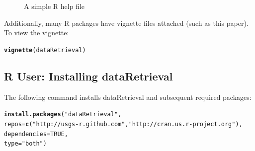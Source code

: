 \documentclass[a4paper,11pt]{article}\usepackage[]{graphicx}\usepackage[]{color}
\makeatletter
\newcommand{\hlnum}[1]{\textcolor[rgb]{0.686,0.059,0.569}{#1}}%
\newcommand{\hlstr}[1]{\textcolor[rgb]{0.192,0.494,0.8}{#1}}%
\newcommand{\hlstd}[1]{\textcolor[rgb]{0.345,0.345,0.345}{#1}}%
\newcommand{\hlkwc}[1]{\textcolor[rgb]{0.333,0.667,0.333}{#1}}%
\newcommand{\hlkwd}[1]{\textcolor[rgb]{0.737,0.353,0.396}{\textbf{#1}}}%
\newenvironment{kframe}{%
 \def\at@end@of@kframe{}%
 \ifinner\ifhmode%
  \def\at@end@of@kframe{\end{minipage}}%
  \begin{minipage}{\columnwidth}%
 \fi\fi%
 \def\FrameCommand##1{\hskip\@totalleftmargin \hskip-\fboxsep
 \colorbox{shadecolor}{##1}\hskip-\fboxsep
     \hskip-\linewidth \hskip-\@totalleftmargin \hskip\columnwidth}%
 \MakeFramed {\advance\hsize-\width
   \@totalleftmargin\z@ \linewidth\hsize
   \@setminipage}}%
 {\par\unskip\endMakeFramed%
 \at@end@of@kframe}
\newenvironment{knitrout}{}{} %
\makeatother
\begin{document}
\begin{figure}[ht!]
\centering
\caption{A simple R help file}
\label{fig:help}
\end{figure}

Additionally, many R packages have vignette files attached (such as this paper). To view the vignette:
\begin{knitrout}
\color{fgcolor}\begin{kframe}
\begin{alltt}
\hlkwd{vignette}\hlstd{(dataRetrieval)}
\end{alltt}
\end{kframe}
\end{knitrout}

\FloatBarrier
\clearpage
\subsection{R User: Installing dataRetrieval}
The following command installs dataRetrieval and subsequent required packages:

\begin{knitrout}
\color{fgcolor}\begin{kframe}
\begin{alltt}
\hlkwd{install.packages}\hlstd{(}\hlstr{"dataRetrieval"}\hlstd{,}
\hlkwc{repos}\hlstd{=}\hlkwd{c}\hlstd{(}\hlstr{"http://usgs-r.github.com"}\hlstd{,}\hlstr{"http://cran.us.r-project.org"}\hlstd{),}
\hlkwc{dependencies}\hlstd{=}\hlnum{TRUE}\hlstd{,}
\hlkwc{type}\hlstd{=}\hlstr{"both"}\hlstd{)}
\end{alltt}
\end{kframe}
\end{knitrout}
\end{document}
